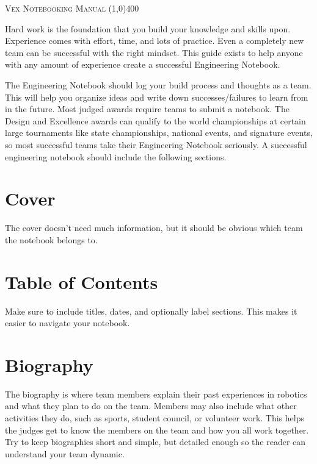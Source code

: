\documentclass[letterpaper, 12pt]{article}
\begin{document}
\begin{center}
\huge\textsc{Vex Notebooking Manual}
\line(1,0){400}

\vspace{0.1in}

\end{center}

Hard work is the foundation that you build your knowledge and skills upon. Experience comes with effort, time, and lots of practice. Even a completely new team can be successful with the right mindset. This guide exists to help anyone with any amount of experience create a successful Engineering Notebook.

The Engineering Notebook should log your build process and thoughts as a team. This will help you organize ideas and write down successes/failures to learn from in the future. Most judged awards require teams to submit a notebook. The Design and Excellence awards can qualify to the world championships at certain large tournaments like state championships, national events, and signature events, so most successful teams take their Engineering Notebook seriously. A successful engineering notebook should include the following sections.

\section*{Cover}

The cover doesn’t need much information, but it should be obvious which team the notebook belongs to.

\section*{Table of Contents}

Make sure to include titles, dates, and optionally label sections. This makes it easier to navigate your notebook.

\section*{Biography}

The biography is where team members explain their past experiences in robotics and what they plan to do on the team. Members may also include what other activities they do, such as sports, student council, or volunteer work. This helps the judges get to know the members on the team and how you all work together. Try to keep biographies short and simple, but detailed enough so the reader can understand your team dynamic.
\end{document}
